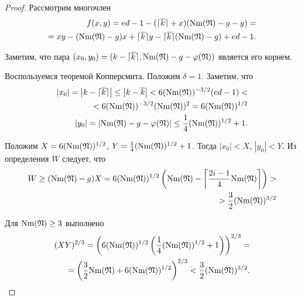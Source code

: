 \documentclass[_00_dissertation.tex]{subfiles}
\begin{document}
\begin{proof}
    Рассмотрим многочлен
    \begin{equation*}
        \begin{split}
            f(x,y) = ed - 1 - (\lceil\overline{k}\rceil + x)(\textrm{Nm}(\mathfrak{N}) - g - y) =\\
            = xy - (\textrm{Nm}(\mathfrak{N}) - g)x + \lceil\overline{k}\rceil y - \lceil\overline{k}\rceil(\textrm{Nm}(\mathfrak{N}) - g) + ed - 1.
        \end{split}
    \end{equation*}
    
    Заметим, что пара $(x_0, y_0) = (k - \lceil\overline{k}\rceil, \textrm{Nm}(\mathfrak{N}) - g - \varphi(\mathfrak{N}))$ является его корнем.
    
    Воспользуемся теоремой Копперсмита.
    Положим $\delta = 1$.
    Заметим, что
    \begin{equation*}
        \begin{split}
            |x_0| = \left|
                k - \lceil\overline{k}\rceil
            \right| \le \left|
                k - \overline{k}
            \right| < 6(\textrm{Nm}(\mathfrak{N}))^{-3/2}(ed-1) < \\
            < 6(\textrm{Nm}(\mathfrak{N}))^{-3/2}(\textrm{Nm}(\mathfrak{N}))^2 = 6(\textrm{Nm}(\mathfrak{N}))^{1/2}\\
            |y_0| = \left|
                \textrm{Nm}(\mathfrak{N}) - g - \varphi(\mathfrak{N})
            \right| \le \frac{1}{4}(\textrm{Nm}(\mathfrak{N}))^{1/2} + 1.
        \end{split}
    \end{equation*}
    
    Положим $X = 6(\textrm{Nm}(\mathfrak{N}))^{1/2}$, $Y = \frac{1}{4}(\textrm{Nm}(\mathfrak{N}))^{1/2} + 1$.
    Тогда $|x_0| < X$, $|y_0| < Y$.
    Из определения $W$ следует, что
    \begin{equation*}
        \begin{split}
            W \ge (\textrm{Nm}(\mathfrak{N}) - g)X = 6(\textrm{Nm}(\mathfrak{N}))^{1/2}\left(
                \textrm{Nm}(\mathfrak{N}) - \left\lceil
                    \frac{2i-1}{4}\textrm{Nm}(\mathfrak{N})
                \right\rceil
            \right) >\\
            > \frac{3}{2}(\textrm{Nm}(\mathfrak{N}))^{3/2}
        \end{split}
    \end{equation*}
    
    Для $\textrm{Nm}(\mathfrak{N}) \ge 3$ выполнено
    \begin{equation*}
        \begin{split}
            (XY)^{2/3} = \left(
                6(\textrm{Nm}(\mathfrak{N}))^{1/2} \left(
                    \frac{1}{4}(\textrm{Nm}(\mathfrak{N}))^{1/2} + 1
                \right)
            \right)^{2/3} =\\
            = \left(
                \frac{3}{2}\textrm{Nm}(\mathfrak{N}) + 6(\textrm{Nm}(\mathfrak{N}))^{1/2}
            \right)^{2/3} < \frac{3}{2}(\textrm{Nm}(\mathfrak{N}))^{3/2}.
        \end{split}
    \end{equation*}
    

\end{proof}
\end{document}

